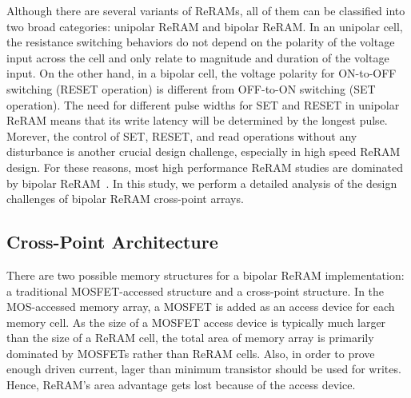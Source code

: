 
Although there are several variants of ReRAMs, all of them can be classified into two broad categories: unipolar ReRAM and bipolar ReRAM. In an unipolar cell, the resistance switching behaviors do not depend on the polarity of the voltage input across the cell and only relate to magnitude and duration of the voltage input. On the other hand, in a bipolar cell, the voltage polarity for ON-to-OFF switching (RESET operation) is different from OFF-to-ON switching (SET operation). %
The need for different pulse widths for SET and RESET in unipolar ReRAM means that its write latency will be determined by the longest pulse. Morever, the control of SET, RESET, and read operations without any disturbance is another crucial design challenge, especially in high speed ReRAM design. %
For these reasons, most high performance ReRAM studies are dominated by bipolar ReRAM~\cite{ReRAM_IEDM2010_Kim,ReRAM_ISSCC2011_Sheu,ReRAM_ISSCC2011_Otsuka}.
In this study, we perform a detailed analysis of the design challenges of bipolar ReRAM cross-point arrays.

\subsection{Cross-Point Architecture}
There are two possible memory structures for a bipolar ReRAM implementation: 
a traditional MOSFET-accessed structure and a cross-point structure. In the 
MOS-accessed memory array, a MOSFET is added as an access device for each memory 
cell. As the size of a MOSFET access device is typically much larger than the size 
of a ReRAM cell, the total area of memory array is primarily dominated by MOSFETs 
rather than ReRAM cells. Also, in order to prove enough driven current, lager than minimum transistor should be used for writes. 
Hence, ReRAM's area advantage gets lost because of the access device. %

